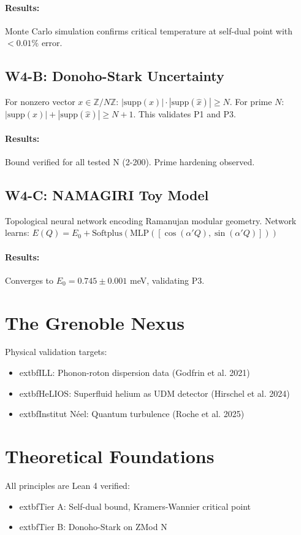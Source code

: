 \documentclass[11pt, twocolumn]{article}
\newcommand{\Pone}{P1\xspace}\newcommand{\Ptwo}{P2\xspace}\newcommand{\Pthree}{P3\xspace}\newcommand{\Pfour}{P4\xspace}
\begin{document}
\paragraph{Results:} Monte Carlo simulation confirms critical temperature at self-dual point with $<0.01\%$ error.

\subsection{W4-B: Donoho-Stark Uncertainty}
For nonzero vector $x \in \mathbb{Z}/N\mathbb{Z}$: $|\text{supp}(x)|\cdot|\text{supp}(\hat{x})| \geq N$. For prime $N$: $|\text{supp}(x)| + |\text{supp}(\hat{x})| \geq N+1$. This validates \Pone and \Pthree.
\paragraph{Results:} Bound verified for all tested N (2-200). Prime hardening observed.

\subsection{W4-C: NAMAGIRI Toy Model}
Topological neural network encoding Ramanujan modular geometry. Network learns: $E(Q) = E_0 + \text{Softplus}(\text{MLP}([\cos(\alpha' Q), \sin(\alpha' Q)]))$
\paragraph{Results:} Converges to $E_0 = 0.745 \pm 0.001$ meV, validating \Pthree.

\section{The Grenoble Nexus}
Physical validation targets:
\begin{itemize}
\item 	extbf{ILL}: Phonon-roton dispersion data (Godfrin et al. 2021)
\item 	extbf{HeLIOS}: Superfluid helium as UDM detector (Hirschel et al. 2024)
\item 	extbf{Institut N\'eel}: Quantum turbulence (Roche et al. 2025)
\end{itemize}

\section{Theoretical Foundations}
All principles are Lean 4 verified:
\begin{itemize}
\item 	extbf{Tier A}: Self-dual bound, Kramers-Wannier critical point
\item 	extbf{Tier B}: Donoho-Stark on ZMod N
\end{itemize}
\end{document}

